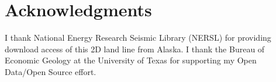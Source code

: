\section{Acknowledgments}
I thank National Energy Research Seismic Library (NERSL) for providing 
download access of this 2D land line from Alaska.  I thank the Bureau 
of Economic Geology at the University of Texas for supporting my 
Open Data/Open Source effort.
 



